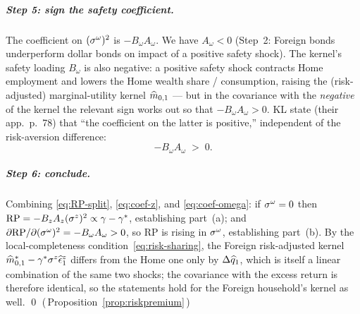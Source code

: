 \subparagraph{Step 5: sign the safety coefficient.} The coefficient on
$(\sigma^{\omega})^2$ is $-B_\omega A_\omega$. We have $A_\omega<0$ (Step~2:
Foreign bonds underperform dollar bonds on impact of a positive safety shock). The
kernel's safety loading $B_\omega$ is also negative: a positive safety shock
contracts Home employment and lowers the Home wealth share / consumption, raising
the (risk-adjusted) marginal-utility kernel $\widehat{m}_{0,1}$ --- but in the
covariance with the \emph{negative} of the kernel the relevant sign works out so
that $-B_\omega A_\omega>0$. KL state (their app.~p.~78) that ``the coefficient on
the latter is positive,'' independent of the risk-aversion difference:
\begin{equation}
-B_\omega A_\omega \;>\;0. \label{eq:coef-omega}
\end{equation}

\subparagraph{Step 6: conclude.} Combining \eqref{eq:RP-split},
\eqref{eq:coef-z}, and \eqref{eq:coef-omega}: if $\sigma^{\omega}=0$ then
$\text{RP}=-B_z A_z(\sigma^z)^2\propto\gamma-\gamma^{*}$, establishing part~(a); and
$\partial\text{RP}/\partial(\sigma^{\omega})^2=-B_\omega A_\omega>0$, so RP is rising
in $\sigma^{\omega}$, establishing part~(b). By the local-completeness
condition~\eqref{eq:risk-sharing}, the Foreign risk-adjusted kernel
$\widehat{m}^{*}_{0,1}-\gamma^{*}\sigma^z\widehat{\epsilon}^z_1$ differs from the Home one only
by $\Delta\widehat{q}_1$, which is itself a linear combination of the same two shocks;
the covariance with the excess return is therefore identical, so the statements
hold for the Foreign household's kernel as well. \qed
(\,Proposition~\ref{prop:riskpremium}\,)

